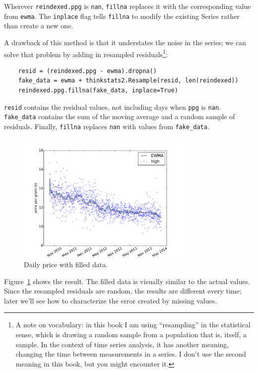 \documentclass[12pt]{book}
\begin{document}
Wherever {\tt reindexed.ppg} is {\tt nan}, {\tt fillna} replaces
it with the corresponding value from {\tt ewma}.  The {\tt inplace}
flag tells {\tt fillna} to modify the existing Series rather than
create a new one.

A drawback of this method is that it understates the noise in the
series; we can solve that problem by adding in resampled
residuals\footnote{A note on vocabulary: in this book I am using
``resampling'' in the statistical sense, which is drawing a random
sample from a population that is, itself, a sample.  In the context
of time series analysis, it has another meaning, changing the
time between measurements in a series.  I don't use the second
meaning in this book, but you might encounter it.}:

\begin{verbatim}
    resid = (reindexed.ppg - ewma).dropna()
    fake_data = ewma + thinkstats2.Resample(resid, len(reindexed))
    reindexed.ppg.fillna(fake_data, inplace=True)
\end{verbatim}

{\tt resid} contains the residual values, not including days
when {\tt ppg} is {\tt nan}.  \verb"fake_data" contains the
sum of the moving average and a random sample of residuals.
Finally, {\tt fillna} replaces {\tt nan} with values from
\verb"fake_data".

\begin{figure}
\centerline{\includegraphics[height=2.5in]{figs/timeseries8.pdf}}
\caption{Daily price with filled data.}
\label{timeseries8}
\end{figure}

Figure~\ref{timeseries8} shows the result.  The filled data is visually
similar to the actual values.  Since the resampled residuals are
random, the results are different every time; later we'll see how
to characterize the error created by missing values.
\end{document}
